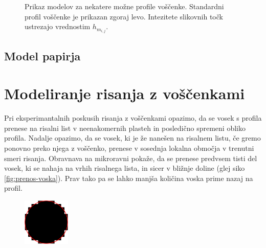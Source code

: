 %
\begin{figure}[htbp]
  \centering
  \caption{Prikaz modelov za nekatere možne profile voščenke. Standardni profil voščenke je prikazan zgoraj levo. Intezitete slikovnih točk ustrezajo vrednostim $h_{m_{i,j}}$.}
  \label{fig:maske-voscenke}
\end{figure}
%
\subsection{Model papirja}
%
\section{Modeliranje risanja z voščenkami}
%
Pri eksperimantalnih poskusih risanja z voščenkami opazimo, da se vosek s profila prenese na risalni list v neenakomernih plasteh in posledično spremeni obliko profila. Nadalje opazimo, da se vosek, ki je že nanešen na risalnem listu, če gremo ponovno preko njega z voščenko, prenese v sosednja lokalna območja v trenutni smeri risanja. Obravnava na mikroravni pokaže, da se prenese predvsem tisti del vosek, ki se nahaja na vrhih risalnega lista, in sicer v bližnje doline (glej siko \ref{fig:prenos-voska}). Prav tako pa se lahko manjša količina voska prime nazaj na profil.

%
\begin{figure}[htbp]
\includegraphics[width=0.2\textwidth]{./slike-latex/area.pdf}
\end{figure}
%
